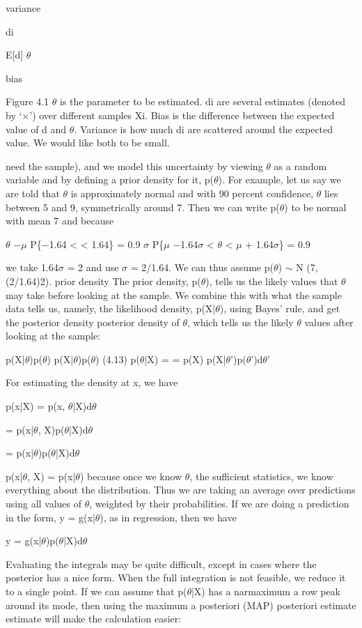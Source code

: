 variance

di

E[d] $\theta$

bias

Figure 4.1 $\theta$ is the parameter to be estimated. di are several estimates (denoted by ‘$\times$’) over different samples Xi. Bias is the difference between the expected value of d and $\theta$. Variance is how much di are scattered around the expected value. We would like both to be small.

need the sample), and we model this uncertainty by viewing $\theta$ as a random variable and by defining a prior density for it, p($\theta$). For example, let us say we are told that $\theta$ is approximately normal and with 90 percent confidence, $\theta$ lies between 5 and 9, symmetrically around 7. Then we can write p($\theta$) to be normal with mean 7 and because

$\theta$ $-$$\mu$ P\{$-$1.64 < < 1.64\} = 0.9 $\sigma$ P\{$\mu$ $-$1.64$\sigma$ < $\theta$ < $\mu$ + 1.64$\sigma$\} = 0.9

we take 1.64$\sigma$ = 2 and use $\sigma$ = 2/1.64. We can thus assume p($\theta$) $\sim$ N (7, (2/1.64)2). prior density The prior density, p($\theta$), tells us the likely values that $\theta$ may take before looking at the sample. We combine this with what the sample data tells us, namely, the likelihood density, p(X|$\theta$), using Bayes’ rule, and get the posterior density posterior density of $\theta$, which tells us the likely $\theta$ values after looking at the sample:

p(X|$\theta$)p($\theta$) p(X|$\theta$)p($\theta$) (4.13) p($\theta$|X) = = p(X) p(X|$\theta$')p($\theta$')d$\theta$'

For estimating the density at x, we have

p(x|X) = p(x, $\theta$|X)d$\theta$

= p(x|$\theta$, X)p($\theta$|X)d$\theta$

= p(x|$\theta$)p($\theta$|X)d$\theta$

p(x|$\theta$, X) = p(x|$\theta$) because once we know $\theta$, the sufficient statistics, we know everything about the distribution. Thus we are taking an average over predictions using all values of $\theta$, weighted by their probabilities. If we are doing a prediction in the form, y = g(x|$\theta$), as in regression, then we have

y = g(x|$\theta$)p($\theta$|X)d$\theta$

Evaluating the integrals may be quite difficult, except in cases where the posterior has a nice form. When the full integration is not feasible, we reduce it to a single point. If we can assume that p($\theta$|X) has a narmaximum a row peak around its mode, then using the maximum a posteriori (MAP) posteriori estimate estimate will make the calculation easier:

